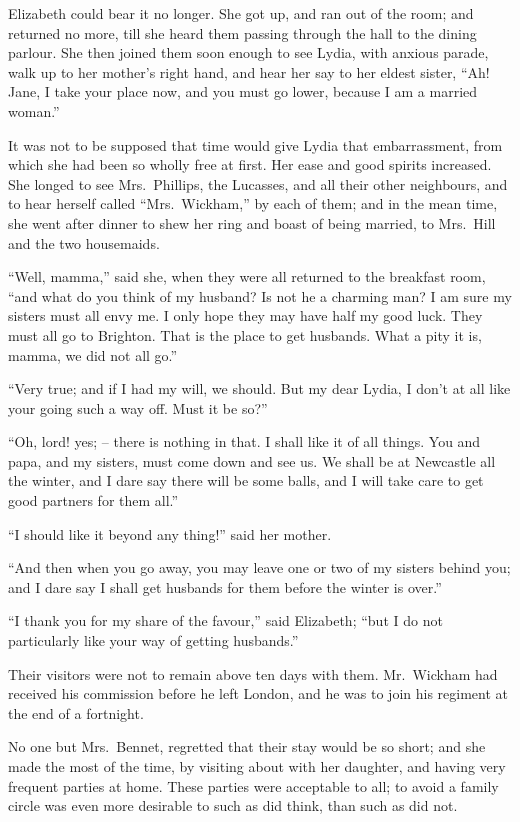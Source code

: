 Elizabeth could bear it no longer. She got up, and ran
out of the room; and returned no more, till she heard
them passing through the hall to the dining parlour.
She then joined them soon enough to see Lydia, with
anxious parade, walk up to her mother’s right hand, and
hear her say to her eldest sister, “Ah! Jane, I take
your place now, and you must go lower, because I am a
married woman.”

It was not to be supposed that time would give Lydia
that embarrassment, from which she had been so wholly
free at first. Her ease and good spirits increased. She
longed to see Mrs.\ Phillips, the Lucasses, and all their
other neighbours, and to hear herself called “Mrs.\ Wickham,”
by each of them; and in the mean time, she went
after dinner to shew her ring and boast of being married,
to Mrs.\ Hill and the two housemaids.

“Well, mamma,” said she, when they were all returned
to the breakfast room, “and what do you think of my
husband? Is not he a charming man? I am sure my
sisters must all envy me. I only hope they may have
half my good luck. They must all go to Brighton. That
is the place to get husbands. What a pity it is, mamma,
we did not all go.”

“Very true; and if I had my will, we should. But
my dear Lydia, I don’t at all like your going such a way
off. Must it be so?”

“Oh, lord! yes; -- there is nothing in that. I shall
like it of all things. You and papa, and my sisters, must
come down and see us. We shall be at Newcastle all the
winter, and I dare say there will be some balls, and I will
take care to get good partners for them all.”

“I should like it beyond any thing!” said her mother.

“And then when you go away, you may leave one
or two of my sisters behind you; and I dare say I shall
get husbands for them before the winter is over.”

“I thank you for my share of the favour,” said Elizabeth;
“but I do not particularly like your way of getting
husbands.”

Their visitors were not to remain above ten days with
them. Mr.\ Wickham had received his commission before
he left London, and he was to join his regiment at the end
of a fortnight.

No one but Mrs.\ Bennet, regretted that their stay
would be so short; and she made the most of the time,
by visiting about with her daughter, and having very
frequent parties at home. These parties were acceptable
to all; to avoid a family circle was even more desirable
to such as did think, than such as did not.

